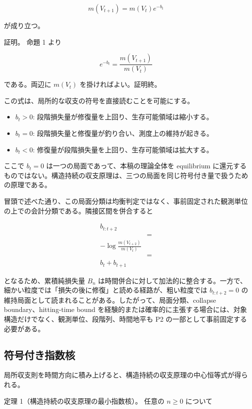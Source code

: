 \documentclass[12pt,a4paper]{article}
\begin{document}
\[
m(V_{t+1}) = m(V_{t}) e^{-b_{t}}
\]

が成り立つ。

証明。 命題 1 より

\[
e^{-b_{t}} = \frac{m(V_{t+1})}{m(V_{t})}
\]

である。両辺に \(m(V_{t})\) を掛ければよい。証明終。

この式は、局所的な収支の符号を直接読むことを可能にする。

\begin{itemize}
\tightlist
\item
  \(b_{t}>0\): 段階損失量が修復量を上回り、生存可能領域は縮小する。
\item
  \(b_{t}=0\): 段階損失量と修復量が釣り合い、測度上の維持が起きる。
\item
  \(b_{t}<0\): 修復量が段階損失量を上回り、生存可能領域は拡大する。
\end{itemize}

ここで \(b_{t}=0\) は一つの局面であって、本稿の理論全体を equilibrium に還元するものではない。構造持続の収支原理は、三つの局面を同じ符号付き量で扱うための原理である。

冒頭で述べた通り、この局面分類は均衡判定ではなく、事前固定された観測単位の上での会計分類である。隣接区間を併合すると

\[
\begin{aligned}
b_{t:t+2} \\
&= \\
-\log\frac{m(V_{t+2})}{m(V_{t})} \\
&= \\
b_{t}+b_{t+1}
\end{aligned}
\]

となるため、累積純損失量 \(B_{n}\) は時間併合に対して加法的に整合する。一方で、細かい粒度では「損失の後に修復」と読める経路が、粗い粒度では \(b_{t:t+2}=0\) の維持局面として読まれることがある。したがって、局面分類、collapse boundary、hitting-time bound を経験的または確率的に主張する場合には、対象構造だけでなく、観測単位、段階列、時間地平も P2 の一部として事前固定する必要がある。

\subsection{符号付き指数核}\label{ux7b26ux53f7ux4ed8ux304dux6307ux6570ux6838}

局所収支則を時間方向に積み上げると、構造持続の収支原理の中心恒等式が得られる。

定理 1（構造持続の収支原理の最小指数核）。 任意の \(n\ge 0\) について
\end{document}
